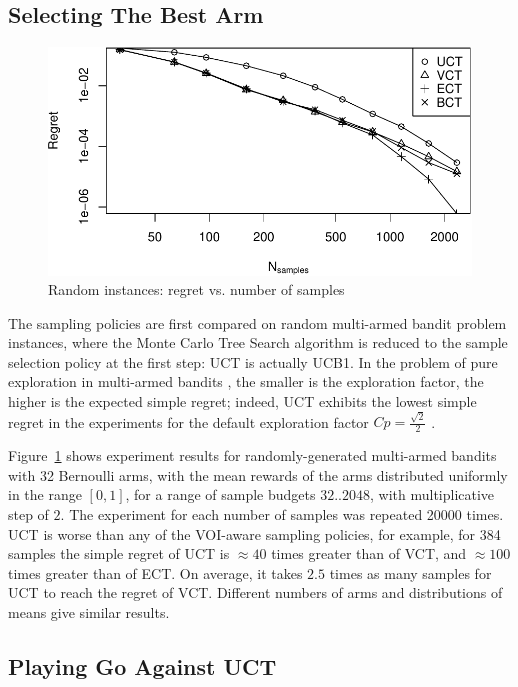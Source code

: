 \documentclass{article}
\begin{document}
\subsection{Selecting The Best Arm}
\label{sec:emp-arm}

\begin{figure}[h]
\centering
\includegraphics[scale=0.8]{flat.pdf}
\caption{Random instances: regret vs. number of samples}
\label{fig:random-instances}
\end{figure}

The sampling policies are first compared on random multi-armed bandit 
problem instances, where the Monte Carlo Tree Search algorithm
is reduced to the sample selection policy at the first step: UCT is 
actually UCB1. In the problem of pure exploration in multi-armed bandits
\cite{Bubeck.pure}, the smaller is the exploration factor, the higher
is the expected simple regret; indeed, UCT exhibits the lowest simple
regret in the experiments for the default exploration factor $Cp=\frac
{\sqrt 2} 2$ \cite{Kocsis.uct}.

Figure~\ref{fig:random-instances} shows experiment results for
randomly-generated multi-armed bandits with 32 Bernoulli arms, with
the mean rewards of the arms distributed uniformly in the range $[0,
  1]$, for a range of sample budgets $32..2048$, with multiplicative
step of $2$. The experiment for each number of samples was repeated
20000 times. UCT is worse than any of the VOI-aware sampling policies,
for example, for 384 samples the simple regret of UCT is $\approx 40$
times greater than of VCT, and $\approx 100$ times greater than of
ECT. On average, it takes $2.5$ times as many samples for UCT to reach
the regret of VCT. Different numbers of arms and distributions of
means give similar results.

\subsection{Playing Go Against UCT}
\label{sec:emp-go}
\end{document}
